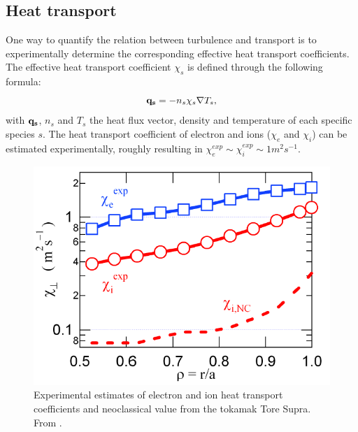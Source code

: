 \subsection{Heat transport} \label{sec:heat_transport}

One way to quantify the relation between turbulence and transport is to experimentally determine the corresponding effective heat transport coefficients. The effective heat transport coefficient $\chi_s$ is defined through the following formula:%
\begin{equation}\label{eq:heat_transport}
  \boldsymbol{\mathrm{q_s}}=-n_s\chi_s{\nabla}T_s,
\end{equation}
\noindent with $\boldsymbol{\mathrm{q_s}}$, $n_s$ and $T_s$ the heat flux vector, density and temperature of each specific species $s$. The heat transport coefficient of electron and ions ($\chi_e$ and $\chi_i$) can be estimated experimentally, roughly resulting in $\chi_e^{exp} \sim \chi_i^{exp} \sim 1m^2s^{-1}$.

\begin{figure}[h]
\begin{centering}
\includegraphics[scale=0.55]{heat_transport_coefficient.png}
\par\end{centering}
\caption{Experimental estimates of electron and ion heat transport coefficients and neoclassical value from the tokamak Tore Supra. From \cite{Sarazin_cours}.}
\label{fig:heat_transport_coefficient}
\end{figure}

